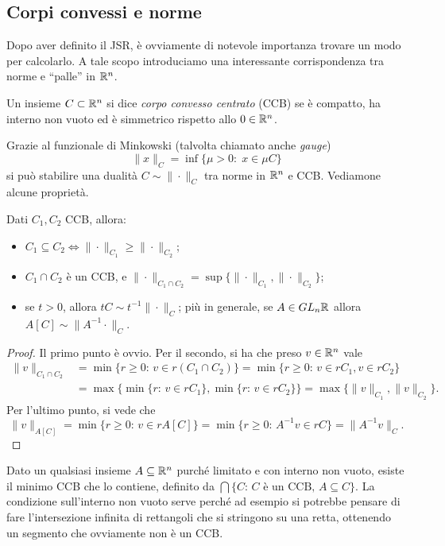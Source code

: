 
\subsection{Corpi convessi e norme}

Dopo aver definito il JSR, è ovviamente di notevole importanza trovare un modo per calcolarlo. 
A tale scopo introduciamo una interessante corrispondenza tra norme e ``palle'' in $\mathbb{R}^{n}$.

\begin{definizione}
	Un insieme $C\subset\mathbb{R}^{n}$ si dice \emph{corpo convesso centrato} (CCB) se è compatto, ha interno non vuoto ed è simmetrico rispetto allo $0\in\mathbb{R}^{n}$.
\end{definizione}

Grazie al funzionale di Minkowski (talvolta chiamato anche \emph{gauge})
$$\|x\|_{C} = \inf\{\mu>0:\; x\in \mu C\}$$
si può stabilire una dualità $C\sim \|\cdot\|_{C}$ tra norme in $\mathbb{R}^{n}$ e CCB. Vediamone alcune proprietà.

\begin{proposizione}
	Dati $C_{1}, C_{2}$ CCB, allora:
	\begin{itemize}
		\item $C_{1}\subseteq C_{2} \iff \|\cdot\|_{C_{1}}\geq\|\cdot\|_{C_{2}}$;
		\item $C_{1}\cap C_{2}$ è un CCB, e $\|\cdot\|_{C_{1}\cap C_{2}} = \sup\{\|\cdot\|_{C_{1}},\|\cdot\|_{C_{2}}\}$;
		\item se $t>0$, allora $tC\sim t^{-1}\|\cdot\|_{C}$; più in generale, se $A\in GL_{n}\mathbb{R}$ allora $A[C]\sim \|A^{-1}\cdot\|_{C}$.
	\end{itemize}
\end{proposizione}
\begin{proof}
	Il primo punto è ovvio. Per il secondo, si ha che preso $v\in\mathbb{R}^{n}$ vale
	\begin{align*}
		\|v\|_{C_{1}\cap C_{2}} &= \min\{r\geq0:\, v\in r(C_{1}\cap C_{2})\}
		= \min\{r\geq0:\, v \in rC_{1}, v\in rC_{2}\} \\&
		= \max\{\min\{r:\, v\in rC_{1}\}, \min\{r:\, v\in rC_{2}\}\} 
		= \max\{\|v\|_{C_{1}}, \|v\|_{C_{2}}\}.
	\end{align*}
	Per l'ultimo punto, si vede che 
		$$\|v\|_{A[C]} = \min\{r\geq0:\, v\in rA[C]\} = \min\{r\geq0:\, A^{-1}v\in rC\} = \|A^{-1}v\|_{C}.$$
\end{proof}

\begin{osservazione}
	Dato un qualsiasi insieme $A\subseteq\mathbb{R}^{n}$ purché limitato e con interno non vuoto, esiste il minimo CCB che lo contiene, definito da $\bigcap\{C:\, C\text{ è un CCB},\,A\subseteq C\}$.
	La condizione sull'interno non vuoto serve perché ad esempio si potrebbe pensare di fare l'intersezione infinita di rettangoli che si stringono su una retta, ottenendo un segmento che ovviamente non è un CCB.
\end{osservazione}

